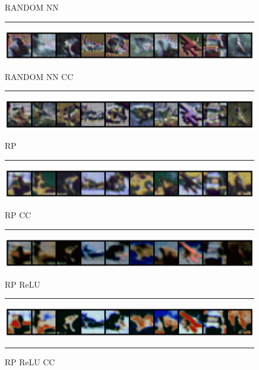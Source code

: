 \begin{figure}
    \centering
    \setlength{\abovecaptionskip}{0pt plus 0pt minus 0pt}
    \setlength{\belowcaptionskip}{16pt plus 0pt minus 0pt}
    \caption*{\normalsize{RANDOM NN}}
    \rule{0.4\textwidth}{.4pt}
    
    \centerline{\hspace*{8mm}\includegraphics[width=1.4\textwidth]{figures/reconstruction_CIFAR10_RANDOM_NN_epoch_100.png}}
    \caption*{\normalsize{RANDOM NN CC}}
    \rule{0.4\textwidth}{.4pt}
    
    \centerline{\hspace*{8mm}\includegraphics[width=1.4\textwidth]{figures/reconstruction_CIFAR10_RANDOM_NN_CC_epoch_100.png}}
    \caption*{\normalsize{RP}}
    \rule{0.4\textwidth}{.4pt}
    
    \centerline{\hspace*{8mm}\includegraphics[width=1.4\textwidth]{figures/reconstruction_CIFAR10_RP_epoch_100.png}}
    \caption*{\normalsize{RP CC}}
    \rule{0.4\textwidth}{.4pt}
    
    \centerline{\hspace*{8mm}\includegraphics[width=1.4\textwidth]{figures/reconstruction_CIFAR10_RP_CC_epoch_100.png}}
    \caption*{\normalsize{RP ReLU}}
    \rule{0.4\textwidth}{.4pt}
    
    \centerline{\hspace*{8mm}\includegraphics[width=1.4\textwidth]{figures/reconstruction_CIFAR10_RP_ReLU_epoch_100.png}}
    \caption*{\normalsize{RP ReLU CC}}
    \rule{0.4\textwidth}{.4pt}
    

\end{figure}
